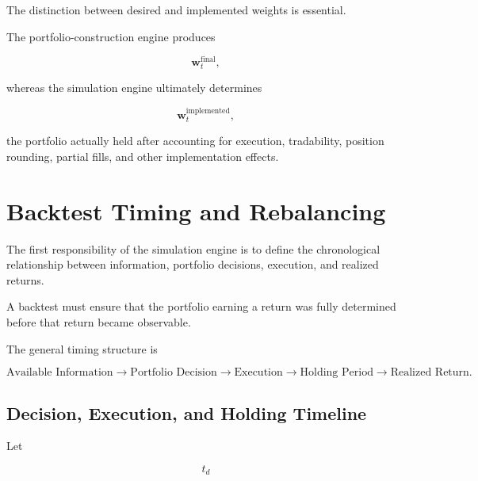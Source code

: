 \documentclass[11pt,a4paper]{article}
\begin{document}
The distinction between desired and implemented weights is essential.

The portfolio-construction engine produces

\begin{equation}
\mathbf{w}_t^{\mathrm{final}},
\end{equation}

whereas the simulation engine ultimately determines

\begin{equation}
\boxed{
\mathbf{w}_t^{\mathrm{implemented}},
}
\end{equation}

the portfolio actually held after accounting for execution, tradability,
position rounding, partial fills, and other implementation effects.


\section{Backtest Timing and Rebalancing}
\label{sec:backtest_timing_rebalancing}

The first responsibility of the simulation engine is to define the chronological
relationship between information, portfolio decisions, execution, and realized
returns.

A backtest must ensure that the portfolio earning a return was fully determined
before that return became observable.

The general timing structure is

\begin{equation}
\boxed{
\text{Available Information}
\rightarrow
\text{Portfolio Decision}
\rightarrow
\text{Execution}
\rightarrow
\text{Holding Period}
\rightarrow
\text{Realized Return}.
}
\end{equation}


\subsection{Decision, Execution, and Holding Timeline}

Let

\begin{equation}
t_d
\end{equation}
\end{document}

